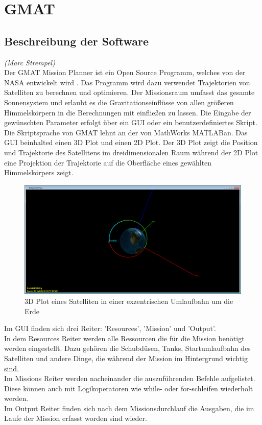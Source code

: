 			
\section{GMAT}
		\subsection{Beschreibung der Software}
		\hfill\emph{(Marc Strempel)}\\
Der GMAT Mission Planner ist ein Open Source Programm, welches von der NASA entwickelt wird \cite{Hughes.}. Das Programm wird dazu verwendet Trajektorien von Satelliten zu berechnen und optimieren. Der Missionsraum umfasst das gesamte Sonnensystem und erlaubt es die Gravitationseinflüsse von allen größeren Himmelskörpern in die Berechnungen mit einfließen zu lassen. 
Die Eingabe der gewünschten Parameter erfolgt über ein GUI oder ein benutzerdefiniertes Skript. Die Skriptsprache von GMAT lehnt an der von MathWorks MATLAB\textregistered \space an.
Das GUI beinhalted einen 3D Plot und einen 2D Plot. Der 3D Plot zeigt die Position und Trajektorie des Satellitens im dreidimensionalen Raum während der 2D Plot eine Projektion der Trajektorie auf die Oberfläche eines gewählten Himmelskörpers zeigt.

\begin{figure}[!h]
	\centering
		\includegraphics[width=1.00\textwidth]{graphics/GMAT/GMAT_OrbitView2.PNG}
		\caption{3D Plot eines Satelliten in einer exzentrischen Umlaufbahn um die Erde}
			\label{fig:OrbitView2}
\end{figure}


	Im GUI finden sich drei Reiter: ’Resources’, ’Mission’ und ’Output’.\\
In dem Resources Reiter werden alle Ressourcen die für die Mission benötigt werden eingestellt. Dazu gehören die Schubdüsen, Tanks, Startumlaufbahn des Satelliten und andere Dinge, die während der Mission im Hintergrund wichtig sind.\\
Im Missions Reiter werden nacheinander die auszuführenden Befehle aufgelistet. Diese können auch mit Logikoperatoren wie while- oder for-schleifen wiederholt werden.\\
Im Output Reiter finden sich nach dem Missionsdurchlauf die Ausgaben, die im Laufe der Mission erfasst worden sind wieder. 


